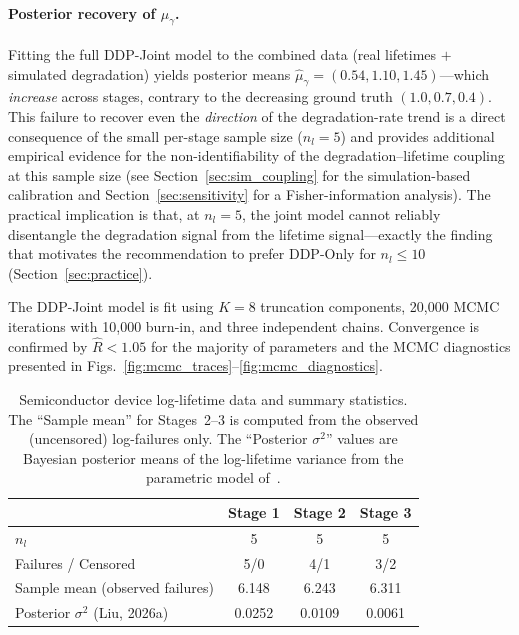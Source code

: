 \documentclass[a4paper,fleqn,longmktitle]{cas-sc}
\begin{document}
\paragraph{Posterior recovery of $\mu_\gamma$.}
Fitting the full DDP-Joint model to the combined data (real lifetimes $+$ simulated degradation) yields posterior means $\widehat{\mu}_\gamma = (0.54, 1.10, 1.45)$---which \emph{increase} across stages, contrary to the decreasing ground truth $(1.0, 0.7, 0.4)$. This failure to recover even the \emph{direction} of the degradation-rate trend is a direct consequence of the small per-stage sample size ($n_l = 5$) and provides additional empirical evidence for the non-identifiability of the degradation--lifetime coupling at this sample size (see Section~\ref{sec:sim_coupling} for the simulation-based calibration and Section~\ref{sec:sensitivity} for a Fisher-information analysis). The practical implication is that, at $n_l = 5$, the joint model cannot reliably disentangle the degradation signal from the lifetime signal---exactly the finding that motivates the recommendation to prefer DDP-Only for $n_l \leq 10$ (Section~\ref{sec:practice}).

The DDP-Joint model is fit using $K = 8$ truncation components, 20,000 MCMC iterations with 10,000 burn-in, and three independent chains. Convergence is confirmed by $\widehat{R} < 1.05$ for the majority of parameters and the MCMC diagnostics presented in Figs.~\ref{fig:mcmc_traces}--\ref{fig:mcmc_diagnostics}.

\begin{table}
\centering
\caption{Semiconductor device log-lifetime data and summary statistics. The ``Sample mean'' for Stages~2--3 is computed from the observed (uncensored) log-failures only. The ``Posterior $\sigma^2$'' values are Bayesian posterior means of the log-lifetime variance from the parametric model of~\cite{Liu2026a}.}
\label{tab:case_data}
\begin{tabular}{lccc}
\toprule
 & Stage 1 & Stage 2 & Stage 3 \\
\midrule
$n_l$ & 5 & 5 & 5 \\
Failures / Censored & 5/0 & 4/1 & 3/2 \\
Sample mean (observed failures) & 6.148 & 6.243 & 6.311 \\
Posterior $\sigma^2$ (Liu, 2026a) & 0.0252 & 0.0109 & 0.0061 \\
\bottomrule
\end{tabular}
\end{table}
\end{document}
